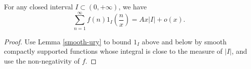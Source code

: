 \begin{proposition}
\label{WienerIkeharaInterval}
\leanok
For any closed interval $I \subset (0,+\infty)$, we have
  $$ \sum_{n=1}^\infty f(n) 1_I( \frac{n}{x} ) = A x |I|  + o(x).$$
\end{proposition}
\begin{proof}
\leanok
Use Lemma \ref{smooth-ury} to bound $1_I$ above and below by smooth compactly supported functions whose integral is close to the measure of $|I|$, and use the non-negativity of $f$.
\end{proof}
